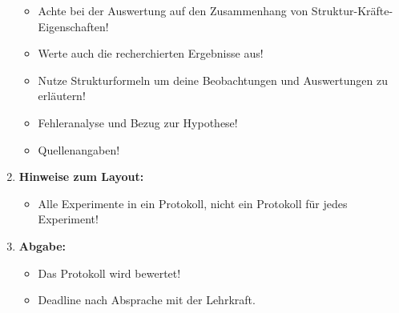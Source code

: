 \documentclass{scrartcl}  %
\begin{document}
\begin{enumerate}
\begin{itemize}
		                \item Achte bei der Auswertung auf den Zusammenhang von Struktur-Kräfte-Eigenschaften!
		                \item Werte auch die recherchierten Ergebnisse aus!
		                \item Nutze Strukturformeln um deine Beobachtungen und Auswertungen zu erläutern!
		                \item Fehleranalyse und Bezug zur Hypothese!
		                \item Quellenangaben!
	                \end{itemize}
	            \item \textbf{Hinweise zum Layout:}
	                \begin{itemize}
		                \item Alle Experimente in ein Protokoll, nicht ein Protokoll für jedes Experiment!
	                \end{itemize}
	            \item \textbf{Abgabe:}
	            	\begin{itemize}
		            	\item Das Protokoll wird bewertet!
	                	\item Deadline nach Absprache mit der Lehrkraft.
					\end{itemize}
				\end{enumerate}
\end{document}
